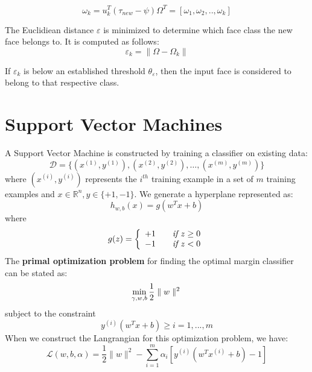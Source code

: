 \documentclass[12pt]{report}			%
\begin{document}
\begin{equation}
\omega_{k} = u_{k}^{T}(\tau_{new} - \psi)	\Omega^{T} = [\omega_{1},\omega_{2},..,\omega_{k}] 
\end{equation}

The Euclidiean distance $\varepsilon$ is minimized to determine which face class the new face belongs to. It is computed as follows:
\begin{equation}
\varepsilon_{k} = \parallel\Omega - \Omega_{k}\parallel 
\end{equation}

If $\varepsilon_{k}$ is below an established threshold $\theta_{\varepsilon}$, then the input face is considered to belong to that respective class.

\section{Support Vector Machines}
A Support Vector Machine is constructed by training a classifier on existing data:
\begin{equation}
\mathcal {D} = \{(x^{(1)},y^{(1)}),(x^{(2)},y^{(2)}),\ldots,(x^{(m)},y^{(m)})\}
\end{equation}
where $(x^{(i)}, y^{(i)})$ represents the $i^{th}$ training example in a set of $m$ training examples and $x \in \mathbb{R}^n, y \in \{+1, -1\}$. We generate a hyperplane represented as:
\begin{equation}
h_{w,b}(x) = g(w^Tx + b)
\end{equation}
where
\begin{equation}
g(z) = \left\{
\begin{array}{l l}
+1 & \quad \textit{if $z \geq 0$}\\
-1 & \quad \textit{if $z < 0$}\\
\end{array} \right.
\end{equation}
The \textbf{primal optimization problem} for finding the optimal margin classifier can be stated as:
\begin{equation}
\min_{\gamma, w, b} \frac{1}{2}\parallel w \parallel ^2\\
\end{equation}
subject to the constraint
\begin{equation}
y^{(i)}(w^Tx + b) \geq i = 1, ..., m
\end{equation}
When we construct the Langrangian for this optimization problem, we have:
\begin{equation} \label{eq:lang}
\mathcal {L}(w, b, \alpha) = \frac{1}{2} \parallel w \parallel ^2 - \sum_{i=1}^{m} \alpha_i [y^{(i)}(w^Tx^{(i)} + b) - 1]
\end{equation}
\end{document}
